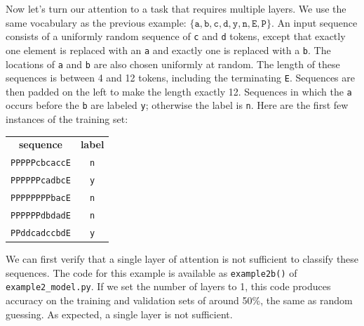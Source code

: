 \documentclass{article}
\newcommand{\ta}{\mathtt{a}}
\newcommand{\tb}{\mathtt{b}}
\newcommand{\tc}{\mathtt{c}}
\newcommand{\td}{\mathtt{d}}
\newcommand{\tn}{\mathtt{n}}
\newcommand{\ty}{\mathtt{y}}
\newcommand{\tE}{\mathtt{E}}
\newcommand{\tP}{\mathtt{P}}
\begin{document}
Now let's turn our attention to a task that requires multiple
layers. We use the same vocabulary as the previous example:
$\{\ta, \tb, \tc, \td, \ty, \tn, \tE, \tP\}$. An input sequence
consists of a uniformly random sequence of \texttt{c} and \texttt{d}
tokens, except that exactly one element is replaced with an \texttt{a}
and exactly one is replaced with a \texttt{b}. The locations of
\texttt{a} and \texttt{b} are also chosen uniformly at random. The
length of these sequences is between 4 and 12 tokens, including the
terminating \texttt{E}. Sequences are then padded on the left to make
the length exactly 12. Sequences in which the \texttt{a} occurs before
the \texttt{b} are labeled \texttt{y}; otherwise the label is
\texttt{n}. Here are the first few instances of the training set:
\begin{center}
\begin{tabular}{cc}
  \textbf{sequence} & \textbf{label} \\
  \texttt{PPPPPcbcaccE} & \texttt{n} \\
  \texttt{PPPPPPcadbcE} & \texttt{y} \\
  \texttt{PPPPPPPPbacE} & \texttt{n} \\
  \texttt{PPPPPPdbdadE} & \texttt{n} \\
  \texttt{PPddcadccbdE} & \texttt{y} \\
\end{tabular}
\end{center}

We can first verify that a single layer of attention is not sufficient
to classify these sequences. The code for this example is available as
\texttt{example2b()} of \texttt{example2\_model.py}. If we set the
number of layers to 1, this code produces accuracy on the training and
validation sets of around 50\%, the same as random guessing. As
expected, a single layer is not sufficient.
\end{document}
